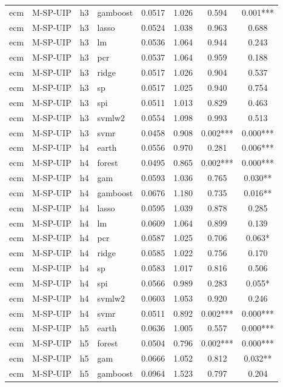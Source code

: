 \begin{ThreePartTable}
\begin{longtable}[t]{llclcccc}
ecm & M-SP-UIP & h3 & gamboost & 0.0517 & 1.026 & 0.594 & 0.001***\\
ecm & M-SP-UIP & h3 & lasso & 0.0524 & 1.038 & 0.963 & 0.688\\
ecm & M-SP-UIP & h3 & lm & 0.0536 & 1.064 & 0.944 & 0.243\\
ecm & M-SP-UIP & h3 & pcr & 0.0537 & 1.064 & 0.959 & 0.188\\
ecm & M-SP-UIP & h3 & ridge & 0.0517 & 1.026 & 0.904 & 0.537\\
ecm & M-SP-UIP & h3 & sp & 0.0517 & 1.025 & 0.940 & 0.754\\
ecm & M-SP-UIP & h3 & spi & 0.0511 & 1.013 & 0.829 & 0.463\\
ecm & M-SP-UIP & h3 & svmlw2 & 0.0554 & 1.098 & 0.993 & 0.513\\
ecm & M-SP-UIP & h3 & svmr & 0.0458 & 0.908 & 0.002*** & 0.000***\\
\addlinespace
ecm & M-SP-UIP & h4 & earth & 0.0556 & 0.970 & 0.281 & 0.006***\\
ecm & M-SP-UIP & h4 & forest & 0.0495 & 0.865 & 0.002*** & 0.000***\\
ecm & M-SP-UIP & h4 & gam & 0.0593 & 1.036 & 0.765 & 0.030**\\
ecm & M-SP-UIP & h4 & gamboost & 0.0676 & 1.180 & 0.735 & 0.016**\\
ecm & M-SP-UIP & h4 & lasso & 0.0595 & 1.039 & 0.878 & 0.285\\
ecm & M-SP-UIP & h4 & lm & 0.0609 & 1.064 & 0.899 & 0.139\\
ecm & M-SP-UIP & h4 & pcr & 0.0587 & 1.025 & 0.706 & 0.063*\\
ecm & M-SP-UIP & h4 & ridge & 0.0585 & 1.022 & 0.756 & 0.170\\
ecm & M-SP-UIP & h4 & sp & 0.0583 & 1.017 & 0.816 & 0.506\\
ecm & M-SP-UIP & h4 & spi & 0.0566 & 0.989 & 0.283 & 0.055*\\
ecm & M-SP-UIP & h4 & svmlw2 & 0.0603 & 1.053 & 0.920 & 0.246\\
ecm & M-SP-UIP & h4 & svmr & 0.0511 & 0.892 & 0.002*** & 0.000***\\
\addlinespace
ecm & M-SP-UIP & h5 & earth & 0.0636 & 1.005 & 0.557 & 0.000***\\
ecm & M-SP-UIP & h5 & forest & 0.0504 & 0.796 & 0.002*** & 0.000***\\
ecm & M-SP-UIP & h5 & gam & 0.0666 & 1.052 & 0.812 & 0.032**\\
ecm & M-SP-UIP & h5 & gamboost & 0.0964 & 1.523 & 0.797 & 0.204\\

\end{longtable}
\end{ThreePartTable}
